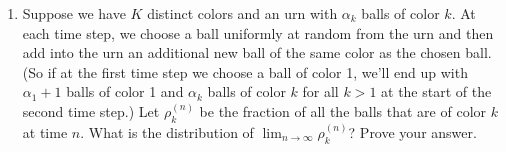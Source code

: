 \documentclass[submit]{harvardml}
\begin{document}
\begin{problem}
\begin{enumerate}[label=(\alph*)]
\item Suppose we have $K$ distinct colors and an urn with $\alpha_k$ balls of color $k$. At each time step, we choose a ball uniformly at random from the urn and then add into the urn an additional new ball of the same color as the chosen ball. (So if at the first time step we choose a ball of color 1, we'll end up with $\alpha_1+1$ balls of color 1 and $\alpha_k$ balls of color $k$ for all $k > 1$ at the start of the second time step.) Let $\rho_{k}^{(n)}$ be the fraction of all the balls that are of color $k$ at time $n$. What is the distribution of $\lim_{n \rightarrow \infty} \rho_k^{(n)}$? Prove your answer.
\end{enumerate}
\vspace{0.1cm}
\end{problem}
\end{document}
